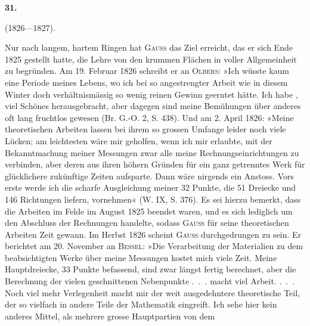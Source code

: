 \clearpage\begingroup{}
\renewcommand{\thefootnote}{\arabic{footnote})}\setcounter{footnote}{0}
\begin{center}
\textbf{31.}\par\smallskip
{}\par
{} (1826—1827).
\end{center}
\noindent\hspace*{\parindent}Nur nach langem, hartem Ringen hat \textsc{Gauss} das Ziel erreicht, das er
sich Ende 1825 gestellt hatte, die Lehre von den krummen Flächen in voller
Allgemeinheit zu begründen. Am 19. Februar 1826 schreibt er an \textsc{Olbers}:
»Ich wüsste kaum eine Periode meines Lebens, wo ich bei so angestrengter
Arbeit wie in diesem Winter doch verhältnismässig so wenig reinen Gewinn
geerntet hätte. Ich habe , viel Schönes herausgebracht, aber dagegen
sind meine Bemühungen über anderes oft  lang fruchtlos gewesen
(Br. G.-O. 2, S. 438). Und am 2. April 1826: »Meine theoretischen Arbeiten
lassen bei ihrem so  grossen Umfange leider noch viele Lücken; am
leichtesten wäre mir geholfen, wenn ich mir erlaubte, mit der Bekanntmachung
meiner Messungen zwar alle meine Rechnungseinrichtungen zu verbinden, aber
deren  aus ihren höhern Gründen für ein ganz getrenntes Werk
für glücklichere zukünftige Zeiten aufsparte. Dann wäre nirgends ein Anstoss.
Vors erste werde ich die scharfe Ausgleichung meiner 32 Punkte, die 51 Dreiecke
und 146 Richtungen liefern, vornehmen« (W. IX, S. 376). Es sei hierzu
bemerkt, dass die Arbeiten im Felde im August 1825 beendet waren, und es
sich lediglich um den Abschluss der Rechnungen handelte, sodass \textsc{Gauss} für
seine theoretischen Arbeiten Zeit gewann.
\clearpage{}\setcounter{footnote}{0}
\indent Im Herbst 1826 scheint \textsc{Gauss} durchgedrungen zu sein. Er berichtet
am 20. November an \textsc{Bessel}: »Die Verarbeitung der Materialien zu dem beabsichtigten
Werke über meine Messungen kostet mich viele Zeit. Meine
Hauptdreiecke, 33 Punkte befassend, sind zwar längst fertig berechnet, aber
die Berechnung der vielen geschnittenen Nebenpunkte .\ .\ . macht viel Arbeit.
.\ .\ . Noch viel mehr Verlegenheit macht mir der weit ausgedehntere
theoretische Teil, der so vielfach in andere Teile der Mathematik eingreift.
Ich sehe hier kein anderes Mittel, als mehrere grosse Hauptpartien von dem
